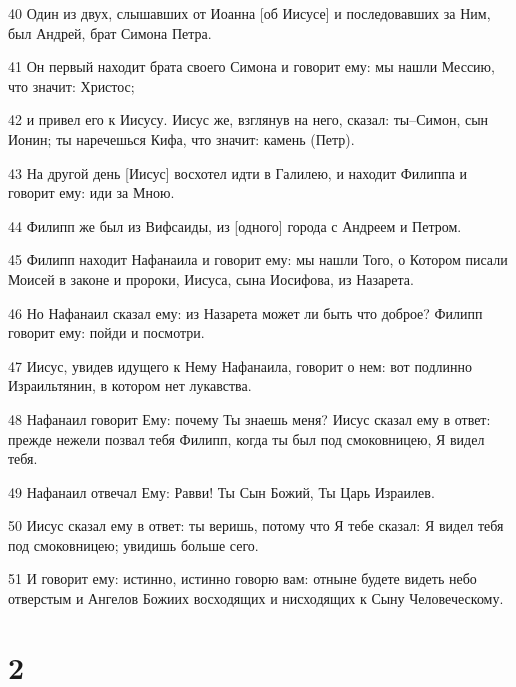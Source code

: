 \par 40 Один из двух, слышавших от Иоанна [об Иисусе] и последовавших за Ним, был Андрей, брат Симона Петра.
\par 41 Он первый находит брата своего Симона и говорит ему: мы нашли Мессию, что значит: Христос;
\par 42 и привел его к Иисусу. Иисус же, взглянув на него, сказал: ты--Симон, сын Ионин; ты наречешься Кифа, что значит: камень (Петр).
\par 43 На другой день [Иисус] восхотел идти в Галилею, и находит Филиппа и говорит ему: иди за Мною.
\par 44 Филипп же был из Вифсаиды, из [одного] города с Андреем и Петром.
\par 45 Филипп находит Нафанаила и говорит ему: мы нашли Того, о Котором писали Моисей в законе и пророки, Иисуса, сына Иосифова, из Назарета.
\par 46 Но Нафанаил сказал ему: из Назарета может ли быть что доброе? Филипп говорит ему: пойди и посмотри.
\par 47 Иисус, увидев идущего к Нему Нафанаила, говорит о нем: вот подлинно Израильтянин, в котором нет лукавства.
\par 48 Нафанаил говорит Ему: почему Ты знаешь меня? Иисус сказал ему в ответ: прежде нежели позвал тебя Филипп, когда ты был под смоковницею, Я видел тебя.
\par 49 Нафанаил отвечал Ему: Равви! Ты Сын Божий, Ты Царь Израилев.
\par 50 Иисус сказал ему в ответ: ты веришь, потому что Я тебе сказал: Я видел тебя под смоковницею; увидишь больше сего.
\par 51 И говорит ему: истинно, истинно говорю вам: отныне будете видеть небо отверстым и Ангелов Божиих восходящих и нисходящих к Сыну Человеческому.

\chapter{2}

